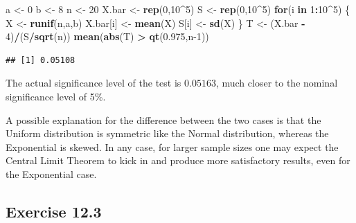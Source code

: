 \documentclass[]{krantz}
\makeatletter
\newenvironment{Shaded}{\begin{snugshade}}{\end{snugshade}}
\newcommand{\ControlFlowTok}[1]{\textcolor[rgb]{0.13,0.29,0.53}{\textbf{#1}}}
\newcommand{\DecValTok}[1]{\textcolor[rgb]{0.00,0.00,0.81}{#1}}
\newcommand{\FloatTok}[1]{\textcolor[rgb]{0.00,0.00,0.81}{#1}}
\newcommand{\KeywordTok}[1]{\textcolor[rgb]{0.13,0.29,0.53}{\textbf{#1}}}
\newcommand{\NormalTok}[1]{#1}
\newcommand{\OperatorTok}[1]{\textcolor[rgb]{0.81,0.36,0.00}{\textbf{#1}}}
\newcommand{\StringTok}[1]{\textcolor[rgb]{0.31,0.60,0.02}{#1}}
\newenvironment{kframe}{%
\medskip{}
\setlength{\fboxsep}{.8em}
 \def\at@end@of@kframe{}%
 \ifinner\ifhmode%
  \def\at@end@of@kframe{\end{minipage}}%
  \begin{minipage}{\columnwidth}%
 \fi\fi%
 \def\FrameCommand##1{\hskip\@totalleftmargin \hskip-\fboxsep
 \colorbox{shadecolor}{##1}\hskip-\fboxsep
     \hskip-\linewidth \hskip-\@totalleftmargin \hskip\columnwidth}%
 \MakeFramed {\advance\hsize-\width
   \@totalleftmargin\z@ \linewidth\hsize
   \@setminipage}}%
 {\par\unskip\endMakeFramed%
 \at@end@of@kframe}
\renewenvironment{Shaded}{\begin{kframe}}{\end{kframe}}
\theoremstyle{definition}
\theoremstyle{definition}
\theoremstyle{definition}
\theoremstyle{remark}
\makeatother
\begin{document}
\begin{enumerate}
\begin{Shaded}
\begin{Highlighting}[]
\NormalTok{a <-}\StringTok{ }\DecValTok{0}
\NormalTok{b <-}\StringTok{ }\DecValTok{8}
\NormalTok{n <-}\StringTok{ }\DecValTok{20}
\NormalTok{X.bar <-}\StringTok{ }\KeywordTok{rep}\NormalTok{(}\DecValTok{0}\NormalTok{,}\DecValTok{10}\OperatorTok{^}\DecValTok{5}\NormalTok{)}
\NormalTok{S <-}\StringTok{ }\KeywordTok{rep}\NormalTok{(}\DecValTok{0}\NormalTok{,}\DecValTok{10}\OperatorTok{^}\DecValTok{5}\NormalTok{)}
\ControlFlowTok{for}\NormalTok{(i }\ControlFlowTok{in} \DecValTok{1}\OperatorTok{:}\DecValTok{10}\OperatorTok{^}\DecValTok{5}\NormalTok{) \{}
\NormalTok{  X <-}\StringTok{ }\KeywordTok{runif}\NormalTok{(n,a,b)}
\NormalTok{  X.bar[i] <-}\StringTok{ }\KeywordTok{mean}\NormalTok{(X)}
\NormalTok{  S[i] <-}\StringTok{ }\KeywordTok{sd}\NormalTok{(X)}
\NormalTok{\}}
\NormalTok{T <-}\StringTok{ }\NormalTok{(X.bar }\OperatorTok{-}\StringTok{ }\DecValTok{4}\NormalTok{)}\OperatorTok{/}\NormalTok{(S}\OperatorTok{/}\KeywordTok{sqrt}\NormalTok{(n))}
\KeywordTok{mean}\NormalTok{(}\KeywordTok{abs}\NormalTok{(T) }\OperatorTok{>}\StringTok{ }\KeywordTok{qt}\NormalTok{(}\FloatTok{0.975}\NormalTok{,n}\DecValTok{-1}\NormalTok{))}
\end{Highlighting}
\end{Shaded}

\begin{verbatim}
## [1] 0.05108
\end{verbatim}

  The actual significance level of the test is \(0.05163\), much closer to
  the nominal significance level of 5\%.

  A possible explanation for the difference between the two cases is that
  the Uniform distribution is symmetric like the Normal distribution,
  whereas the Exponential is skewed. In any case, for larger sample sizes
  one may expect the Central Limit Theorem to kick in and produce more
  satisfactory results, even for the Exponential case.
\end{enumerate}

\hypertarget{exercise-12.3}{%
\subsection*{Exercise 12.3}\label{exercise-12.3}}
\end{document}
